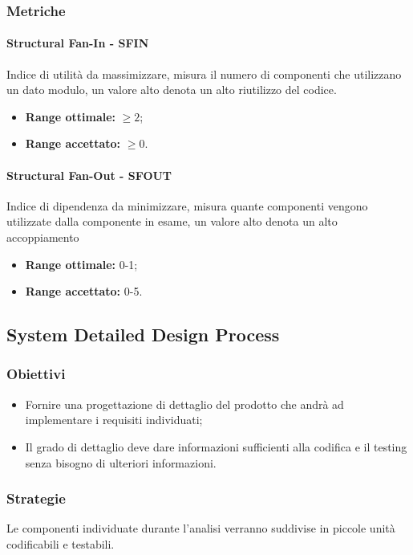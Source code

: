 		\subsubsection{Metriche}
			\paragraph{Structural Fan-In - SFIN} \Spazio
			Indice di utilità da massimizzare, misura il numero di componenti che utilizzano un dato modulo, un valore alto denota un alto riutilizzo del codice.
			\begin{itemize}
				\item \textbf{Range ottimale:} $\geq 2$;
				\item \textbf{Range accettato:} $\geq 0$.
			\end{itemize}
			\paragraph{Structural Fan-Out - SFOUT} \Spazio
			Indice di dipendenza da minimizzare, misura quante componenti vengono utilizzate dalla componente in esame, un valore alto denota un alto accoppiamento
			\begin{itemize}
				\item \textbf{Range ottimale:} 0-1;
				\item \textbf{Range accettato:} 0-5.
			\end{itemize}
            

\subsection{System Detailed Design Process}
		\subsubsection{Obiettivi}
		\begin{itemize}
			\item Fornire una progettazione di dettaglio del prodotto che andrà ad implementare i requisiti individuati;
			\item Il grado di dettaglio deve dare informazioni sufficienti alla codifica e il testing senza bisogno di ulteriori informazioni.
		\end{itemize}
		\subsubsection{Strategie}
		Le componenti individuate durante l'analisi verranno suddivise in piccole unità codificabili e testabili.
